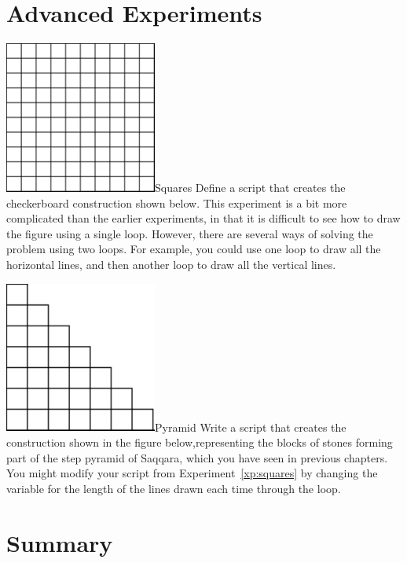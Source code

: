 \documentclass[a4paper,10pt,twoside]{book}
\begin{document}
\section{Advanced Experiments}

\begin{exofigwithsizeandtitle}[0.5]{\includegraphics[width=5cm]{damier}}{Squares}\label{xp:squares}
Define a script that creates the checkerboard construction shown below. This experiment is a bit more complicated than the earlier experiments, in that it is difficult to see how to draw the figure using a single loop. However, there are several ways of solving the problem using two loops. For example, you could use one loop to draw all the horizontal lines, and then another loop to draw all the vertical lines.	
\end{exofigwithsizeandtitle}

\begin{exofigwithsizeandtitle}[0.5]{\includegraphics[width=5cm]{cubesandpyramid}}{Pyramid}
Write a script that creates the construction shown in the figure below,representing the blocks of stones forming part of the step pyramid of Saqqara, which you have seen in previous chapters. You might modify your script from Experiment~\ref{xp:squares} by changing the variable for the length of the lines drawn each time through the loop. 
\end{exofigwithsizeandtitle}

\section{Summary}
\end{document}
